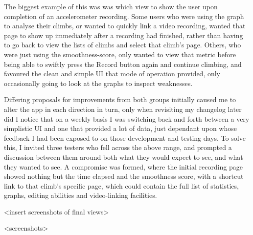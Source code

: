 The biggest example of this was was which view to show the user upon completion of an accelerometer recording.
Some users who were using the graph to analyse their climbs, or wanted to quickly link a video recording, wanted that page to show up immediately after a recording had finished, rather than having to go back to view the lists of climbs and select that climb's page.
Others, who were just using the smoothness-score, only wanted to view that metric before being able to swiftly press the Record button again and continue climbing, and favoured the clean and simple UI that mode of operation provided, only occasionally going to look at the graphs to inspect weaknesses.

Differing proposals for improvements from both groups initially caused me to alter the app in each direction in turn, only when revisiting my changelog later did I notice that on a weekly basis I was switching back and forth between a very simplistic  UI and one that provided a lot of data, just dependant upon whose feedback I had been exposed to on those development and testing days.
To solve this, I invited three testers who fell across the above range, and prompted a discussion between them around both what they would expect to see, and what they wanted to see.
A compromise was formed, where the initial recording page showed nothing but the time elapsed and the smoothness score, with a shortcut link to that climb's specific page, which could contain the full list of statistics, graphs, editing abilities and video-linking facilities.

<insert screenshots of final views>



<screenshots>

